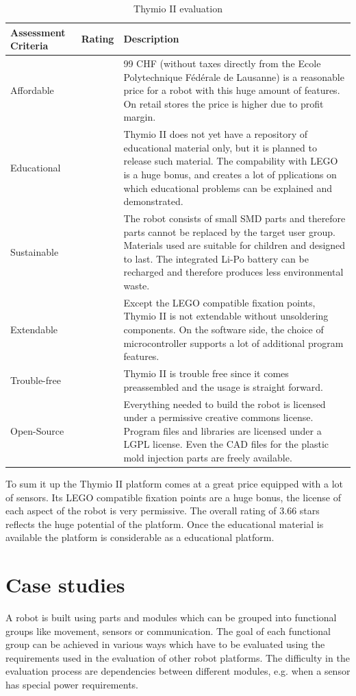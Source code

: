 \documentclass[11pt,a4paper]{article}
\newcounter{starnumber}
\newcommand{\stars}[1]{
  \forloop{starnumber}{1}{\value{starnumber} < 6}{
    \ifthenelse{#1 < \value{starnumber}}{\ding{73}}{\ding{72}}%
  }
}
\begin{document}
\begin{table}[h!]
\centering
\begin{tabular}{p{}p{}p{}}
\toprule
Assessment Criteria    & Rating & Description \\
\midrule
Affordable  & \stars{4}    & 99 CHF (without taxes directly from the Ecole Polytechnique Fédérale de Lausanne) is a reasonable price for a robot with this huge amount of features. On retail stores the price is higher due to profit margin.\\
Educational & \stars{3}     & Thymio II does not yet have a repository of educational material only, but it is planned to release such material. The compability with LEGO is a huge bonus, and creates a lot of pplications on which educational problems can be explained and demonstrated.\\
Sustainable  & \stars{3}     & The robot consists of small SMD parts and therefore parts cannot be replaced by the target user group. Materials used are suitable for children and designed to last. The integrated Li-Po battery can be recharged and therefore produces less environmental waste.\\
Extendable & \stars{3} & Except the LEGO compatible fixation points, Thymio II is not extendable without unsoldering components. On the software side, the choice of microcontroller supports a lot of additional program features.\\
Trouble-free & \stars{4} & Thymio II is trouble free since it comes preassembled and the usage is straight forward.\\
Open-Source & \stars{5} & Everything needed to build the robot is licensed under a permissive creative commons license. Program files and libraries are licensed under a LGPL license. Even the CAD files for the plastic mold injection parts are freely available.\\
\bottomrule
\end{tabular}
\caption{Thymio II evaluation}
\label{tbl:thymio_eval}
\end{table}

To sum it up the Thymio II platform comes at a great price equipped with a lot of sensors. Its LEGO compatible fixation points are a huge bonus, the license of each aspect of the robot is very permissive. The overall rating of 3.66 stars reflects the huge potential of the platform. Once the educational material is available the platform is considerable as a educational platform.

\section{Case studies}
A robot is built using parts and modules which can be grouped into functional groups like movement, sensors or communication. The goal of each functional group can be achieved in various ways which have to be evaluated using the requirements used in the evaluation of other robot platforms. The difficulty in the evaluation process are dependencies between different modules, e.g. when a sensor has special power requirements. 
\end{document}
